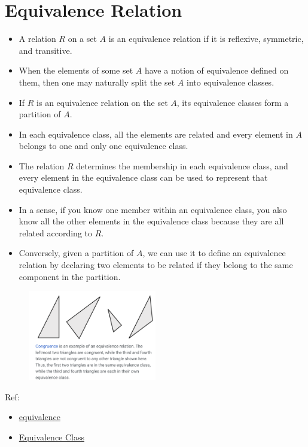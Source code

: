 \documentclass[en,hazy,blue,normal,12pt]{elegantnote}
\begin{document}
\section{Equivalence Relation}
\begin{itemize}
\item A relation $R$ on a set $A$ is an equivalence relation if it is 
reflexive, symmetric, and transitive.
\item When the elements of some set $A$ have a notion of equivalence defined on 
them, then one may naturally split the set $A$ into equivalence classes.
\item If $R$ is an equivalence relation on the set $A$, its equivalence classes 
form a partition of $A$.
\item In each equivalence class, all the elements are related and every element 
in $A$ belongs to one and only one equivalence class.
\item The relation $R$ determines the membership in each equivalence class, and 
every element in the equivalence class can be used to represent that equivalence 
class.
\item In a sense, if you know one member within an equivalence class, you also 
know all the other elements in the equivalence class because they are all 
related according to $R$.
\item Conversely, given a partition of $A$, we can use it to define 
an equivalence relation by declaring two elements to be related if they belong 
to the same component in the partition.
\end{itemize}
\begin{figure}[H]
\centering
\includegraphics[width=0.5\textwidth]{equ-class.png}
\end{figure}
Ref: 
\begin{itemize}
\item \href{
https://math.libretexts.org/Courses/Monroe_Community_College/MTH_220_Discrete_Ma
th/6\%3A_Relations/6.3\%3A_Equivalence_Relations_and_Partitions}{equivalence}
\item \href{https://en.wikipedia.org/wiki/Equivalence_class}{Equivalence Class}
\end{itemize}
\end{document}
